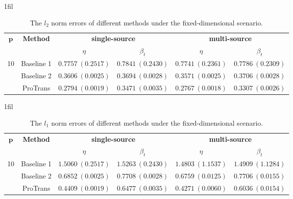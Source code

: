 \documentclass[12pt]{article}
\makeatletter
\newcommand*{\centerfloat}{%
  \parindent \z@
  \leftskip \z@ \@plus 1fil \@minus \marginparwidth
  \rightskip \leftskip
  \parfillskip \z@skip}
\makeatother
\begin{document}
\begin{table}[!ht]
\renewcommand{\arraystretch}{0.6}
\footnotesize
    \centerfloat
    \caption{The $l_2$ norm errors of different methods under the fixed-dimensional scenario.}
    \label{tab:sup:fixed_p_l2}
    \begin{tabular}{cccccc}
        \toprule
        \multirow{2}{*}{$\bm{p}$} & \multirow{2}{*}{\textbf{Method}} & \multicolumn{2}{c}{\textbf{single-source}} & \multicolumn{2}{c}{\textbf{multi-source}}\\
        \cmidrule(lr){3-4} \cmidrule(lr){5-6} 
        & & $\eta$ & $\beta_{t}$ & $\eta$& $\beta_{t}$ \\
        \midrule
        \multirow{3}{*}{10} 
        & Baseline 1 & $0.7757\ (0.2517)$  & $0.7841\ (0.2430)$ & $0.7741\ (0.2361)$ & $0.7786\ (0.2309)$ \\ 
        & Baseline 2 & $0.3606\ (0.0025)$  & $0.3694\ (0.0028)$ & $0.3571\ (0.0025)$ & $0.3706\ (0.0028)$ \\ 
        & ProTrans    & $\bm{0.2794}\ (0.0019)$ & $\bm{0.3471}\ (0.0035)$ & $\bm{0.2767}\ (0.0018)$ & $\bm{0.3307}\ (0.0026)$ \\
        \bottomrule
    \end{tabular}
\end{table}



\begin{table}[!ht]
\renewcommand{\arraystretch}{0.6}
\footnotesize
    \centerfloat
    \caption{The $l_1$ norm errors of different methods under the fixed-dimensional scenario.}
    \label{tab:sup:fixed_p_l1}
    \begin{tabular}{cccccc}
        \toprule
        \multirow{2}{*}{$\bm{p}$} & \multirow{2}{*}{\textbf{Method}} & \multicolumn{2}{c}{\textbf{single-source}} & \multicolumn{2}{c}{\textbf{multi-source}}\\
        \cmidrule(lr){3-4} \cmidrule(lr){5-6} 
        & & $\eta$ & $\beta_{t}$ & $\eta$& $\beta_{t}$ \\
        \midrule
        \multirow{3}{*}{10} 
        & Baseline 1 & $1.5060\ (0.2517)$  & $1.5263\ (0.2430)$ & $1.4803\ (1.1537)$ & $1.4909\ (1.1284)$ \\ 
        & Baseline 2 & $0.6852\ (0.0025)$  & $0.7708\ (0.0028)$ & $0.6759\ (0.0125)$ & $0.7706\ (0.0155)$ \\ 
        & ProTrans    & $\bm{0.4409}\ (0.0019)$ & $\bm{0.6477}\ (0.0035)$ & $\bm{0.4271}\ (0.0060)$ & $\bm{0.6036}\ (0.0154)$ \\
        \bottomrule
    \end{tabular}
\end{table}
\end{document}
